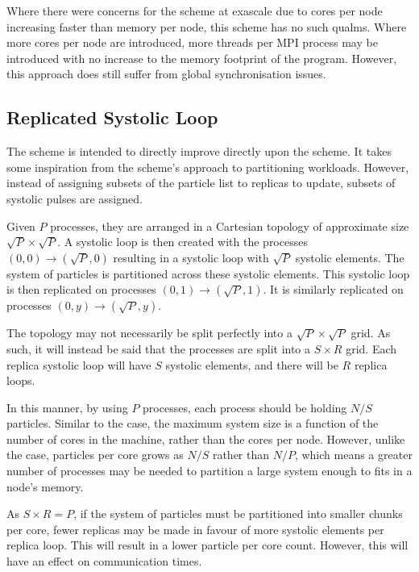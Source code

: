 Where there were concerns for the \replicateddata{} scheme at exascale
due to cores per node increasing faster than memory per node,
this scheme has no such qualms.
%
Where more cores per node are introduced,
more \openmp{} threads per MPI process
may be introduced with no increase to
the memory footprint of the program.
%
However, this approach does still suffer from global synchronisation issues.



\subsection{Replicated Systolic Loop}

%
The \replicatedsystolicloop{} scheme is intended to directly improve directly
upon the \systolicloop{} scheme.
%
It takes some inspiration from the \replicateddata{} scheme's approach
to partitioning workloads.
%
However, instead of assigning subsets of the particle list to replicas
to update, subsets of systolic pulses are assigned.

Given $P$ processes, they are arranged in a Cartesian topology of
approximate size $\sqrt{P} \times{} \sqrt{P}$.
%
A systolic loop is then created with the processes
$(0,0) \rightarrow{} (\sqrt{P}, 0)$
resulting in a systolic loop with $\sqrt{P}$ systolic elements.
%
The system of particles is partitioned across these systolic elements.
%
This systolic loop is then replicated on processes
$(0,1) \rightarrow{} (\sqrt{P}, 1)$.
%
It is similarly replicated on processes $(0,y) \rightarrow{} (\sqrt{P},y)$.

The topology may not necessarily be split perfectly into a
$\sqrt{P} \times{} \sqrt{P}$ grid.
%
As such, it will instead be said that the processes are split into a
$S \times{} R$ grid.
%
Each replica systolic loop will have $S$ systolic elements,
and there will be $R$ replica loops.


In this manner, by using $P$ processes, each process should be holding
$N/S$ particles.
%
Similar to the \systolicloop{} case, the maximum system size is a function
of the number of cores in the machine, rather than the cores per node.
%
However, unlike the \systolicloop{} case, particles per core grows as
$N/S$ rather than $N/P$, which means a greater number of processes
may be needed to partition a large system enough to fits in
a node's memory.

As $S \times{} R = P$,
if the system of particles must be partitioned into
smaller chunks per core,
fewer replicas may be made in favour of more systolic elements
per replica loop.
%
This will result in a lower particle per core count.
%
However, this will have an effect on communication times.


